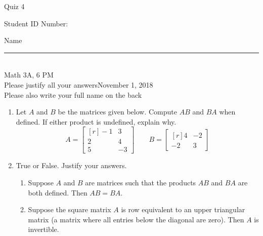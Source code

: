 \documentclass[12pt]{article}
\begin{document}
\begin{flushleft} 
\centerline{\LARGE{Quiz 4}} 
\vspace{5 mm}
{Student ID Number:}\hfill  
{Name \rule {2 in}{0.01in}}\\
Math 3A, 6 PM
\\
{Please justify all your answers}\hfill {November 1, 2018}
\\
{Please also write your full name on the back} 

\medskip
\end{flushleft}

\begin{enumerate}
	\item Let $A$ and $B$ be the matrices given below. Compute $AB$ and $BA$ when defined. If either product is undefined, explain why.
	\[
	A = \begin{bmatrix*}[r]
		-1 & 3\\
		2 & 4\\
		5 & -3
	\end{bmatrix*}\qquad
	B = \begin{bmatrix*}[r]
		4 & -2\\
		-2 & 3
	\end{bmatrix*}
	\]
	\vfill


	\item True or False. Justify your answers.
	\begin{enumerate}
		\item Suppose $A$ and $B$ are matrices such that the products $AB$ and $BA$ are both defined. Then $AB = BA$.

		\vfill

		\item Suppose the square matrix $A$ is row equivalent to an upper triangular matrix (a matrix where all entries below the diagonal are zero). Then $A$ is invertible.

		\vfill
	\end{enumerate}
\end{enumerate}

\end{document}

